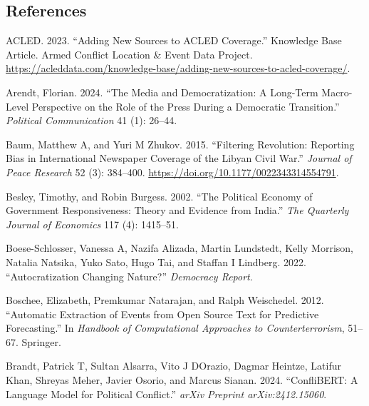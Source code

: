 \documentclass[
  letterpaper,
  DIV=11,
  numbers=noendperiod]{scrartcl}
\newlength{\cslhangindent}
\newlength{\cslentryspacingunit} %
\newenvironment{CSLReferences}[2] %
 {%
  \setlength{\parindent}{0pt}
  \ifodd #1
  \let\oldpar\par
  \def\par{\hangindent=\cslhangindent\oldpar}
  \fi
  \setlength{\parskip}{#2\cslentryspacingunit}
 }%
 {}
\begin{document}
\hypertarget{references}{%
\subsection*{References}\label{references}}

\hypertarget{refs}{}
\begin{CSLReferences}{1}{0}
\leavevmode{}%
ACLED. 2023. {``Adding New Sources to {ACLED} Coverage.''} Knowledge
Base Article. Armed Conflict Location \& Event Data Project.
\url{https://acleddata.com/knowledge-base/adding-new-sources-to-acled-coverage/}.

\leavevmode{}%
Arendt, Florian. 2024. {``The Media and Democratization: A Long-Term
Macro-Level Perspective on the Role of the Press During a Democratic
Transition.''} \emph{Political Communication} 41 (1): 26--44.

\leavevmode{}%
Baum, Matthew A, and Yuri M Zhukov. 2015. {``Filtering Revolution:
Reporting Bias in International Newspaper Coverage of the Libyan Civil
War.''} \emph{Journal of Peace Research} 52 (3): 384--400.
\url{https://doi.org/10.1177/0022343314554791}.

\leavevmode{}%
Besley, Timothy, and Robin Burgess. 2002. {``The Political Economy of
Government Responsiveness: Theory and Evidence from India.''} \emph{The
Quarterly Journal of Economics} 117 (4): 1415--51.

\leavevmode{}%
Boese-Schlosser, Vanessa A, Nazifa Alizada, Martin Lundstedt, Kelly
Morrison, Natalia Natsika, Yuko Sato, Hugo Tai, and Staffan I Lindberg.
2022. {``Autocratization Changing Nature?''} \emph{Democracy Report}.

\leavevmode{}%
Boschee, Elizabeth, Premkumar Natarajan, and Ralph Weischedel. 2012.
{``Automatic Extraction of Events from Open Source Text for Predictive
Forecasting.''} In \emph{Handbook of Computational Approaches to
Counterterrorism}, 51--67. Springer.

\leavevmode{}%
Brandt, Patrick T, Sultan Alsarra, Vito J DOrazio, Dagmar Heintze,
Latifur Khan, Shreyas Meher, Javier Osorio, and Marcus Sianan. 2024.
{``ConfliBERT: A Language Model for Political Conflict.''} \emph{arXiv
Preprint arXiv:2412.15060}.


\end{CSLReferences}
\end{document}
